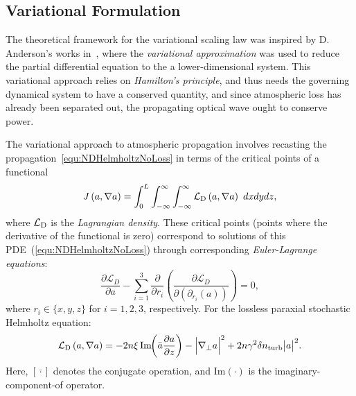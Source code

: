 \documentclass[9pt,twocolumn,twoside]{osajnl}
\newcommand\pder[2]{\frac{\partial #1}{\partial #2}}
\let\truesum=\sum
\def\sum{\mathop{\textstyle\truesum}\limits}
\newcommand{\la}[1]{\label{#1}}
\newcommand{\pp}[2]{\frac{\partial #1}{\partial #2}}
\begin{document}
\vspace*{-3mm}
\subsection{Variational Formulation}
The theoretical framework for the variational scaling law was inspired by D. 
Anderson’s works in~\cite{anderson1983variational, anderson1988approximate, anderson1996variational}, 
where the {\em variational approximation} was used  to reduce the partial 
differential equation to the a lower-dimensional system. 
This variational approach relies on {\em Hamilton's principle}, and thus needs
the governing dynamical system to have a conserved quantity, and since 
atmospheric loss has already been separated out, the propagating optical wave 
ought to conserve power.  

The variational approach to atmospheric propagation involves recasting the 
propagation~\eqref{equ:NDHelmholtzNoLoss} in terms of the critical points of a functional
\begin{equation}\la{equ:Functional}
J\left( a, \nabla a \right) = \int_{0}^{L} \int_{-\infty}^{\infty} \int_{-\infty}^{\infty} {\cal L}_{\text{D}}\left( a, \nabla a \right) \ 
dxdydz,
\end{equation}
where ${\cal L}_{\text{D}}$ is the {\em Lagrangian density}.  
These critical points (points where the derivative of the functional is zero) 
correspond to solutions of this PDE~(\ref{equ:NDHelmholtzNoLoss})
through corresponding {\em Euler-Lagrange equations}:
\begin{equation}
 \pder{\mathcal{L}_{D}}{a} - \sum_{i = 1}^{3}\pder{}{r_{i}}\left(\pder{\mathcal{L}_{D}}{(\partial_{r_{i}}(a))}\right) = 0,
\end{equation}
where $r_{i} \in \{ x, y, z \}$ for $i = 1,2,3$, respectively. 
For the lossless paraxial stochastic Helmholtz equation:
\begin{equation}\la{equ:LagrangianDensity}
 {\cal L}_{\text{D}}\left( a, \nabla a \right) = -2n \xi \, \mathrm{Im}\hspace*{-.1cm}\left(\bar{a} 
 \pp{a}{z}\right) - \Big| \nabla_{\perp} a \Big|^{2} +  2 n \gamma^{2} \delta n_{\text{turb}} \big| 
 a \big|^{2}.
\end{equation}
Here, $[\bar{\cdot}]$ denotes the conjugate operation, and $\text{Im}(\cdot)$ is the imaginary-component-of operator.  
\end{document}
